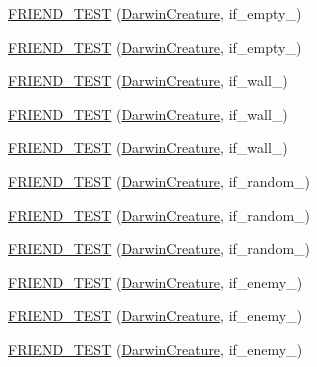 \begin{DoxyCompactItemize}
\item 
\hyperlink{classCreature_aacb8069067015a59eed2e8b478df410d}{F\-R\-I\-E\-N\-D\-\_\-\-T\-E\-S\-T} (\hyperlink{classCreature_a16df2cdab1d993dc2dcb9db1b56dd808}{Darwin\-Creature}, if\-\_\-empty\-\_)
\item 
\hyperlink{classCreature_a36a29525aa4f71283b0d1635f621045c}{F\-R\-I\-E\-N\-D\-\_\-\-T\-E\-S\-T} (\hyperlink{classCreature_a16df2cdab1d993dc2dcb9db1b56dd808}{Darwin\-Creature}, if\-\_\-empty\-\_)
\item 
\hyperlink{classCreature_a843f752e208cff7a80ae1c4852f21122}{F\-R\-I\-E\-N\-D\-\_\-\-T\-E\-S\-T} (\hyperlink{classCreature_a16df2cdab1d993dc2dcb9db1b56dd808}{Darwin\-Creature}, if\-\_\-wall\-\_)
\item 
\hyperlink{classCreature_a0622e43bc0cde977fb3ec5fdf4cff10b}{F\-R\-I\-E\-N\-D\-\_\-\-T\-E\-S\-T} (\hyperlink{classCreature_a16df2cdab1d993dc2dcb9db1b56dd808}{Darwin\-Creature}, if\-\_\-wall\-\_)
\item 
\hyperlink{classCreature_a0b8b1ab404486c62a2a73ada3c2afbec}{F\-R\-I\-E\-N\-D\-\_\-\-T\-E\-S\-T} (\hyperlink{classCreature_a16df2cdab1d993dc2dcb9db1b56dd808}{Darwin\-Creature}, if\-\_\-wall\-\_)
\item 
\hyperlink{classCreature_a613d93d2ffa66b9da0b36e2f111c9274}{F\-R\-I\-E\-N\-D\-\_\-\-T\-E\-S\-T} (\hyperlink{classCreature_a16df2cdab1d993dc2dcb9db1b56dd808}{Darwin\-Creature}, if\-\_\-random\-\_)
\item 
\hyperlink{classCreature_aca1b81315c882a459981ab88c9329c3a}{F\-R\-I\-E\-N\-D\-\_\-\-T\-E\-S\-T} (\hyperlink{classCreature_a16df2cdab1d993dc2dcb9db1b56dd808}{Darwin\-Creature}, if\-\_\-random\-\_)
\item 
\hyperlink{classCreature_a9d901d19824e5ec5862efec0c90547fa}{F\-R\-I\-E\-N\-D\-\_\-\-T\-E\-S\-T} (\hyperlink{classCreature_a16df2cdab1d993dc2dcb9db1b56dd808}{Darwin\-Creature}, if\-\_\-random\-\_)
\item 
\hyperlink{classCreature_af7882c782fae58e5d3197ff8d15c0f27}{F\-R\-I\-E\-N\-D\-\_\-\-T\-E\-S\-T} (\hyperlink{classCreature_a16df2cdab1d993dc2dcb9db1b56dd808}{Darwin\-Creature}, if\-\_\-enemy\-\_)
\item 
\hyperlink{classCreature_aad79b7031c3239175977b7a28ba9687d}{F\-R\-I\-E\-N\-D\-\_\-\-T\-E\-S\-T} (\hyperlink{classCreature_a16df2cdab1d993dc2dcb9db1b56dd808}{Darwin\-Creature}, if\-\_\-enemy\-\_)
\item 
\hyperlink{classCreature_a49e7ce49330d8c72149b7411ba9d8a33}{F\-R\-I\-E\-N\-D\-\_\-\-T\-E\-S\-T} (\hyperlink{classCreature_a16df2cdab1d993dc2dcb9db1b56dd808}{Darwin\-Creature}, if\-\_\-enemy\-\_)

\end{DoxyCompactItemize}
